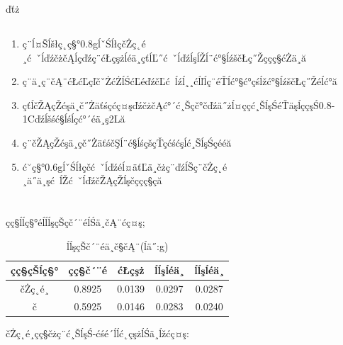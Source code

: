 ďťż\documentclass[10.5pt]{article}
\begin{document}
\subsection{\textbf{}}
\begin{enumerate}
\item ç¨ĺ¤Šĺšłç˛ç§°0.8gĺˇŚĺłçčŻç˛é¸ć ˇĺďźčżčĄĺçďźç¨ćŁçşżĺéä¸çťĺĽ˝ć ˇĺďźĺşĺŽĺ¨ć°§ĺźščŁç˝Žççç§ćŻä¸­ă
\item ç¨ä¸ç¨čĄ¨ćŁćĽçľčˇŻćŻĺŚćĽéďźčĽć ĺźĺ¸¸ćĺľĺç¨éŤĺć°§ć°çśĺžć°§ĺźščŁç˝Žéĺć°ă
\item çťĺčŽĄçŽćşä¸č˝Żäťśçćç¤şďźčżčĄć°´ć¸Šçč°čďźä˝żĺ¤ç­çć¸ŠĺşŚéŤäşĺç­çşŚ0.8-1\degree Cďźĺšść§ĺśĺç­ć°´éä¸ş2Lă
\item ç¨čŽĄçŽćşä¸çč˝ŻäťśčŞĺ¨ć§ĺśçšçŤçćśćşĺć¸ŠĺşŚçééă
\item ć˘ç§°0.6gĺˇŚĺłçčć ˇĺďźéĺ¤äťĽä¸čżç¨ďźĺŠç¨čŻç˛é¸ä˝ä¸şć ĺŽć ˇĺďźčŽĄçŽĺşčççç§ç­ă
\end{enumerate}
\section{\textbf{}}
\subsection{\textbf{}}
çç§ĺĺç§°éĺĺĺşçŠçč´¨éĺŚä¸čĄ¨ćç¤ş;
\begin{table}[!ht]
\centering
\caption{ĺĺşçŠč´¨éä¸č§čĄ¨(ĺä˝:g)}
\begin{tabular}{ccccc}
\hline
çç§çŠĺç§° & çç§č´¨é& ćŁçşż & ĺĺşĺéä¸ & ĺĺşĺéä¸\\
\hline
čŻç˛é¸ & 0.8925 & 0.0139 & 0.0297 & 0.0287\\
č & 0.5925 & 0.0146 & 0.0283 & 0.0240 \\
\hline
\end{tabular}
\end{table}
čŻç˛é¸çç§čżç¨ć¸ŠĺşŚ-ćśé´ĺĺć˛çşżĺŚä¸ĺžćç¤ş:
\end{document}
